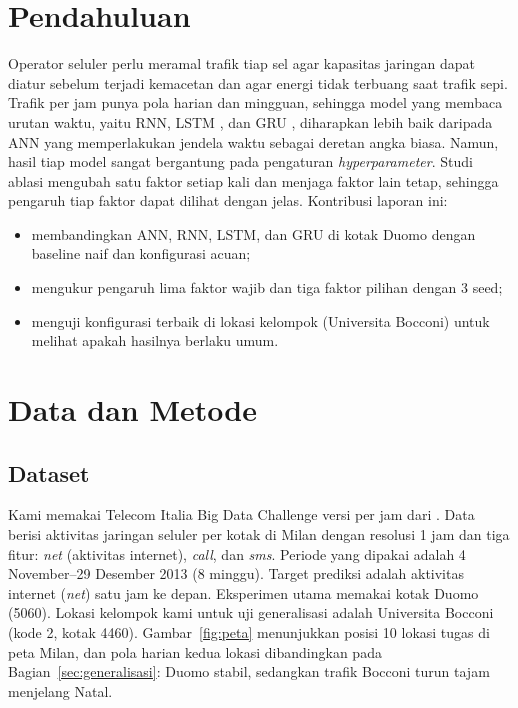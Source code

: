 \documentclass[conference,a4paper]{IEEEtran}
\begin{document}
\section{Pendahuluan}
Operator seluler perlu meramal trafik tiap sel agar kapasitas jaringan dapat diatur sebelum terjadi kemacetan dan agar energi tidak terbuang saat trafik sepi. Trafik per jam punya pola harian dan mingguan, sehingga model yang membaca urutan waktu, yaitu RNN, LSTM \cite{hochreiter1997lstm}, dan GRU \cite{cho2014gru}, diharapkan lebih baik daripada ANN yang memperlakukan jendela waktu sebagai deretan angka biasa. Namun, hasil tiap model sangat bergantung pada pengaturan \textit{hyperparameter}. Studi ablasi mengubah satu faktor setiap kali dan menjaga faktor lain tetap, sehingga pengaruh tiap faktor dapat dilihat dengan jelas. Kontribusi laporan ini:
\begin{itemize}
  \item membandingkan ANN, RNN, LSTM, dan GRU di kotak Duomo dengan baseline naif dan konfigurasi acuan;
  \item mengukur pengaruh lima faktor wajib dan tiga faktor pilihan dengan 3 seed;
  \item menguji konfigurasi terbaik di lokasi kelompok (Universita Bocconi) untuk melihat apakah hasilnya berlaku umum.
\end{itemize}
 
\section{Data dan Metode}
 
\subsection{Dataset}
Kami memakai Telecom Italia Big Data Challenge \cite{barlacchi2015milan} versi per jam dari \cite{zhang2021fedda}. Data berisi aktivitas jaringan seluler per kotak di Milan dengan resolusi 1 jam dan tiga fitur: \textit{net} (aktivitas internet), \textit{call}, dan \textit{sms}. Periode yang dipakai adalah 4 November--29 Desember 2013 (8 minggu). Target prediksi adalah aktivitas internet (\textit{net}) satu jam ke depan. Eksperimen utama memakai kotak Duomo (5060). Lokasi kelompok kami untuk uji generalisasi adalah Universita Bocconi (kode 2, kotak 4460). Gambar~\ref{fig:peta} menunjukkan posisi 10 lokasi tugas di peta Milan, dan pola harian kedua lokasi dibandingkan pada Bagian~\ref{sec:generalisasi}: Duomo stabil, sedangkan trafik Bocconi turun tajam menjelang Natal.
 
\end{document}
